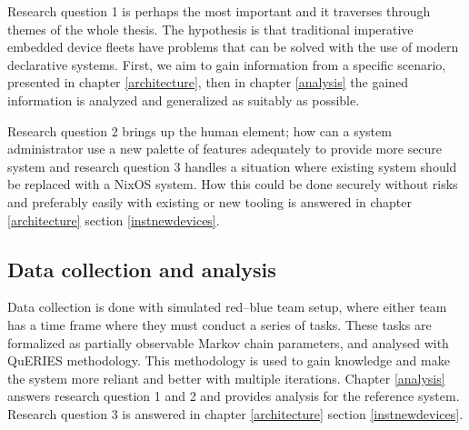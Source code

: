 Research question 1 is perhaps the most important and it traverses
through themes of the whole thesis. The hypothesis is that traditional
imperative embedded device fleets have problems that can be solved
with the use of modern declarative systems. First, we aim to gain
information from a specific scenario, presented in chapter
\ref{architecture}, then in chapter \ref{analysis} the gained
information is analyzed and generalized as suitably as possible.

Research question 2 brings up the human element; how can a system
administrator use a new palette of features adequately to provide more
secure system and research question 3 handles a situation where
existing system should be replaced with a NixOS system. How this
could be done securely without risks and preferably easily with
existing or new tooling is answered in chapter \ref{architecture}
section \ref{instnewdevices}.

\subsection{Data collection and analysis}

Data collection is done with simulated red–blue team setup, where
either team has a time frame where they must conduct a series of
tasks. These tasks are formalized as partially observable Markov chain
parameters, and analysed with QuERIES methodology. This methodology is
used to gain knowledge and make the system more reliant and better
with multiple iterations. Chapter \ref{analysis} answers research
question 1 and 2 and provides analysis for the reference
system. Research question 3 is answered in chapter \ref{architecture}
section \ref{instnewdevices}.
